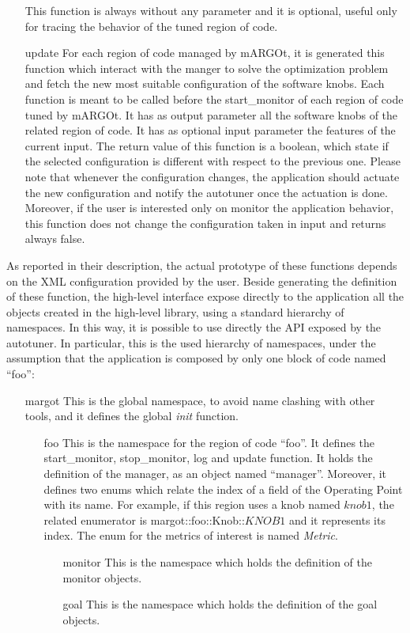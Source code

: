 \begin{itemize}
	This function is always without any parameter and it is optional, useful only for tracing the behavior of the tuned region of code.
	\item[update] For each region of code managed by mARGOt, it is generated this function which interact with the manger to solve the optimization problem and fetch the new most suitable configuration of the software knobs.
	Each function is meant to be called before the start\_monitor of each region of code tuned by mARGOt.
	It has as output parameter all the software knobs of the related region of code.
	It has as optional input parameter the features of the current input.
	The return value of this function is a boolean, which state if the selected configuration is different with respect to the previous one.
	Please note that whenever the configuration changes, the application should actuate the new configuration and notify the autotuner once the actuation is done.
	Moreover, if the user is interested only on monitor the application behavior, this function does not change the configuration taken in input and returns always false.
\end{itemize}
As reported in their description, the actual prototype of these functions depends on the XML configuration provided by the user.
Beside generating the definition of these function, the high-level interface expose directly to the application all the objects created in the high-level library, using a standard hierarchy of namespaces.
In this way, it is possible to use directly the API exposed by the autotuner.
In particular, this is the used hierarchy of namespaces, under the assumption that the application is composed by only one block of code named ``foo'':
\begin{itemize}
	\item[margot] This is the global namespace, to avoid name clashing with other tools, and it defines the global \textit{init} function.
	\begin{itemize}
		\item[foo] This is the namespace for the region of code ``foo''. 
		It defines the start\_monitor, stop\_monitor, log and update function.
		It holds the definition of the manager, as an object named ``manager''.
		Moreover, it defines two enums which relate the index of a field of the Operating Point with its name.
		For example, if this region uses a knob named $knob1$, the related enumerator is margot::foo::Knob::$KNOB1$ and it represents its index.
		The enum for the metrics of interest is named \textit{Metric}.
		\begin{itemize}
			\item[monitor] This is the namespace which holds the definition of the monitor objects.
			\item[goal] This is the namespace which holds the definition of the goal objects.
		\end{itemize}
	\end{itemize}
\end{itemize}


